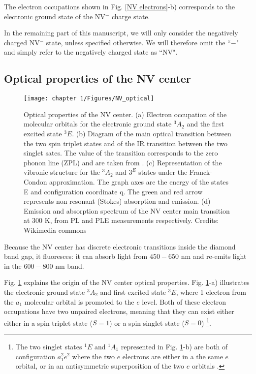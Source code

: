\documentclass[a4paper,11pt]{report}
\begin{document}
\begin{refsection}
The electron occupations shown in Fig. \ref{NV electrons}-b) corresponds to the electronic ground state of the NV$^-$ charge state.

In the remaining part of this manuscript, we will only consider the negatively charged NV$^-$ state, unless specified otherwise. We will therefore omit the ``$-$" and simply refer to the negatively charged state as ``NV".
\subsection{Optical properties of the NV center}
\begin{figure}[h!]
\centering
\texttt{[image: chapter 1/Figures/NV\_optical]}
\caption{Optical properties of the NV center. (a) Electron occupation of the molecular orbitals for the electronic ground state $^3A_2$ and the first excited state $^3E$. (b) Diagram of the main optical transition between the two spin triplet states and of the IR transition between the two singlet sates. The value of the transition corresponds to the zero phonon line (ZPL) and are taken from \citep{doherty2013nitrogen}. (c) Representation of the vibronic structure for the $^3A_2$ and $3^E$ states under the Franck-Condon approximation. The graph axes are the energy of the states E and configuration coordinate q. The green and red arrow represents non-resonant (Stokes) absorption and emission. (d) Emission and absorption spectrum of the NV center main transition at 300 K, from PL and PLE measurements respectively. Credits: Wikimedia commons}
\label{NV optical}
\end{figure}

Because the NV center has discrete electronic transitions inside the diamond band gap, it fluoresces: it can absorb light from $450-650$ nm and re-emits light in the $600-800$ nm band.

Fig. \ref{NV optical} explains the origin of the NV center optical properties. Fig. \ref{NV optical}-a) illustrates the electronic ground state $^3A_2$ and first excited state $^3E$, where 1 electron from the $a_1$ molecular orbital is promoted to the $e$ level. Both of these electron occupations have two unpaired electrons, meaning that they can exist either either in a spin triplet state ($S=1$) or a spin singlet state ($S=0$) \footnote{The two singlet states $^1E$ and $^1A_1$ represented in Fig. \ref{NV optical}-b) are both of configuration $a_1^2e^2$ where the two $e$ electrons are either in a the same $e$ orbital, or in an antisymmetric superposition of the two $e$ orbitals \citep{doherty2011negatively}.}. 


\end{refsection}
\end{document}

